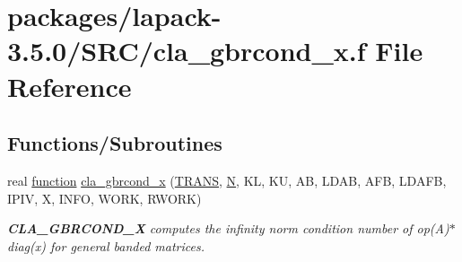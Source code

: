 \hypertarget{cla__gbrcond__x_8f}{}\section{packages/lapack-\/3.5.0/\+S\+R\+C/cla\+\_\+gbrcond\+\_\+x.f File Reference}
\label{cla__gbrcond__x_8f}
\subsection*{Functions/\+Subroutines}
\begin{DoxyCompactItemize}
\item 
real \hyperlink{afunc_8m_a7b5e596df91eadea6c537c0825e894a7}{function} \hyperlink{group__complexGBcomputational_gadb609bd9007944665792e03ef4bf3ae9}{cla\+\_\+gbrcond\+\_\+x} (\hyperlink{superlu__enum__consts_8h_a0c4e17b2d5cea33f9991ccc6a6678d62a1f61e3015bfe0f0c2c3fda4c5a0cdf58}{T\+R\+A\+N\+S}, \hyperlink{polmisc_8c_a0240ac851181b84ac374872dc5434ee4}{N}, K\+L, K\+U, A\+B, L\+D\+A\+B, A\+F\+B, L\+D\+A\+F\+B, I\+P\+I\+V, X, I\+N\+F\+O, W\+O\+R\+K, R\+W\+O\+R\+K)
\begin{DoxyCompactList}\small\item\em {\bfseries C\+L\+A\+\_\+\+G\+B\+R\+C\+O\+N\+D\+\_\+\+X} computes the infinity norm condition number of op(\+A)$\ast$diag(x) for general banded matrices. \end{DoxyCompactList}\end{DoxyCompactItemize}
